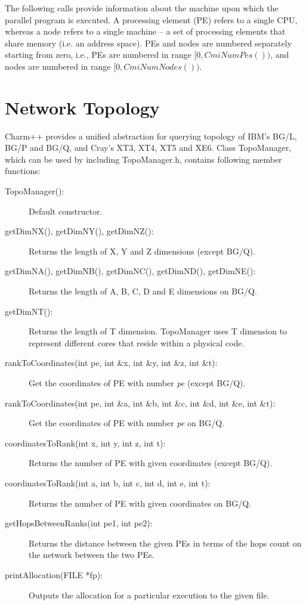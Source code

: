 The following calls provide information about the machine upon which the
parallel program is executed. A processing element (PE) refers to a single CPU,
whereas a node refers to a single machine -- a set of processing elements that share
memory (i.e. an address space).  PEs and nodes are numbered separately starting
from zero, i.e., PEs are numbered in range $[0,CmiNumPes())$, and nodes are
numbered in range $[0,CmiNumNodes())$.

\section{Network Topology}
Charm++ provides a unified abstraction for querying topology of IBM's BG/L, BG/P
and BG/Q, and Cray's XT3, XT4, XT5 and XE6. Class TopoManager, which can be used 
by including TopoManager.h, contains following member functions:

\begin{description}
\item [TopoManager():] Default constructor.
\item [getDimNX(), getDimNY(), getDimNZ():] Returns the length of X, Y and Z
dimensions (except BG/Q).
\item [getDimNA(), getDimNB(), getDimNC(), getDimND(), getDimNE():] Returns the
length of A, B, C, D and E dimensions on BG/Q.
\item [getDimNT():] Returns the length of T dimension. TopoManager uses T
dimension to represent different cores that reside within a physical code.
\item [rankToCoordinates(int pe, int \&x, int \&y, int \&z, int \&t):] Get the
coordinates of PE with number {\em pe} (except BG/Q).
\item [rankToCoordinates(int pe, int \&a, int \&b, int \&c, int \&d, int \&e, int
\&t):] Get the coordinates of PE with number {\em pe} on BG/Q.
\item [coordinatesToRank(int x, int y, int z, int t):] Returns the number of PE
with given coordinates (except BG/Q).
\item [coordinatesToRank(int a, int b, int c, int d, int e, int t):] Returns the
number of PE with given coordinates on BG/Q.
\item [getHopsBetweenRanks(int pe1, int pe2):] Returns the distance between the
given PEs in terms of the hops count on the network between the two PEs.
\item [printAllocation(FILE *fp):] Outputs the allocation for a particular
execution to the given file.

\end{description}




